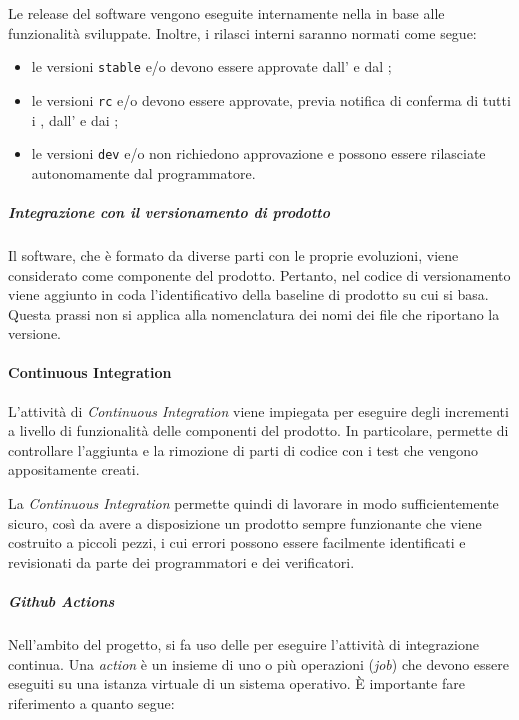 		Le release del software vengono eseguite internamente nella  in base alle funzionalità sviluppate. Inoltre, i rilasci interni saranno normati come segue:
		\begin{itemize}
			\item le versioni \verb!stable! e/o  devono essere approvate dall' e dal ;
			\item le versioni \verb!rc! e/o  devono essere approvate, previa notifica di conferma di tutti i , dall' e dai ;
			\item le versioni \verb!dev! e/o  non richiedono approvazione e possono essere rilasciate autonomamente dal programmatore.
		\end{itemize}

		\subparagraph{Integrazione con il versionamento di prodotto}

		Il software, che è formato da diverse parti con le proprie evoluzioni, viene considerato come componente del prodotto. Pertanto, nel codice di versionamento viene aggiunto in coda l'identificativo della baseline di prodotto su cui si basa. Questa prassi non si applica alla nomenclatura dei nomi dei file che riportano la versione.

	\paragraph{Continuous Integration}

	L'attività di \textit{Continuous Integration} viene impiegata per eseguire degli incrementi a livello di funzionalità delle componenti del prodotto. In particolare, permette di controllare l'aggiunta e la rimozione di parti di codice con i test che vengono appositamente creati.

	La \textit{Continuous Integration} permette quindi di lavorare in modo sufficientemente sicuro, così da avere a disposizione un prodotto sempre funzionante che viene costruito a piccoli pezzi, i cui errori possono essere facilmente identificati e revisionati da parte dei programmatori e dei verificatori.

		\subparagraph{Github Actions}

		Nell'ambito del progetto, si fa uso delle  per eseguire l'attività di integrazione continua. Una \textit{action} è un insieme di uno o più operazioni (\textit{job}) che devono essere eseguiti su una istanza virtuale di un sistema operativo. È importante fare riferimento a quanto segue:

